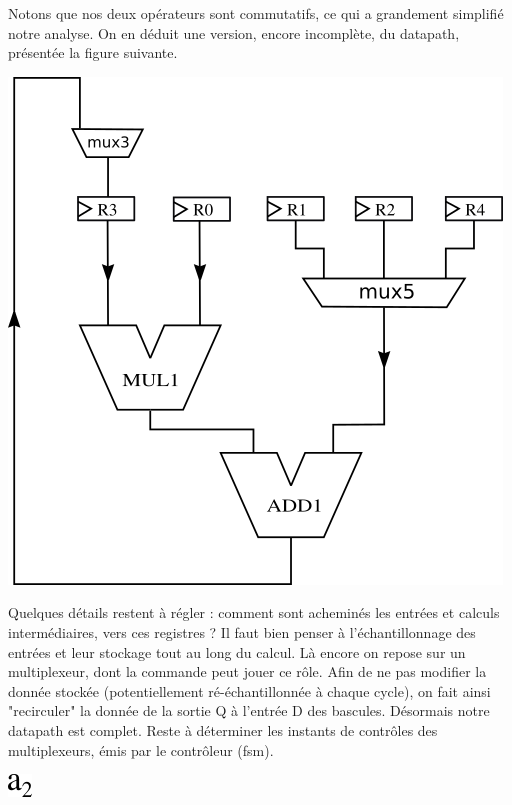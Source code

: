 \documentclass[a4paper,11pt]{exam}
\begin{document}
\begin{questions}
\begin{solution}
      Notons que nos deux opérateurs sont commutatifs, ce qui a grandement simplifié notre analyse. On en déduit une version, encore incomplète, du datapath, présentée la figure suivante.
      \begin{center}
        \includegraphics[scale=0.4]{datapath_primitif.png}
      \end{center}
      Quelques détails restent à régler : comment sont acheminés les entrées et calculs intermédiaires, vers ces registres ? Il faut bien penser à l'échantillonnage des entrées et leur stockage tout au long du calcul. Là encore on repose sur un multiplexeur, dont la commande peut jouer ce rôle. Afin de ne pas modifier la donnée stockée (potentiellement ré-échantillonnée à chaque cycle), on fait ainsi "recirculer" la donnée de la sortie Q à l'entrée D des bascules.
      Désormais notre datapath est complet. Reste à déterminer les instants de contrôles des multiplexeurs, émis par le contrôleur (fsm).
      \begin{center}
        \includegraphics[scale=0.4]{datapath.png}
      \end{center}


\end{solution}
\end{questions}
\end{document}

